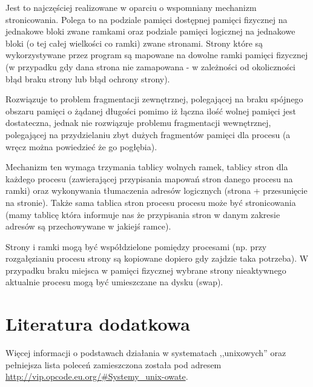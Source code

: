 \documentclass{pdfBooklets}
\begin{document}
Jest to najczęściej realizowane w oparciu o wspomniany mechanizm stronicowania. Polega to na podziale pamięci dostępnej pamięci fizycznej na jednakowe bloki zwane ramkami oraz podziale pamięci logicznej na jednakowe bloki (o tej całej wielkości co ramki) zwane stronami. Strony które są wykorzystywane przez program są mapowane na dowolne ramki pamięci fizycznej (w przypadku gdy dana strona nie zamapowana - w zależności od okoliczności błąd braku strony lub błąd ochrony strony).

Rozwiązuje to problem fragmentacji zewnętrznej, polegającej na braku spójnego obszaru pamięci o żądanej długości pomimo iż łączna ilość wolnej pamięci jest dostateczna, jednak nie rozwiązuje problemu fragmentacji wewnętrznej, polegającej na przydzielaniu zbyt dużych fragmentów pamięci dla procesu (a wręcz można powiedzieć że go pogłębia).

Mechanizm ten wymaga trzymania tablicy wolnych ramek, tablicy stron dla każdego procesu (zawierającej przypisania mapowań stron danego procesu na ramki) oraz wykonywania tłumaczenia adresów logicznych (strona + przesunięcie na stronie). Także sama tablica stron procesu procesu może być stronicowania (mamy tablicę która informuje nas że przypisania stron w danym zakresie adresów są przechowywane w jakiejś ramce).

Strony i ramki mogą być współdzielone pomiędzy procesami (np. przy rozgałęzianiu procesu strony są kopiowane dopiero gdy zajdzie taka potrzeba). W przypadku braku miejsca w pamięci fizycznej wybrane strony nieaktywnego aktualnie procesu mogą być umieszczane na dysku (swap).

\section{Literatura dodatkowa}
 Więcej informacji o podstawach działania w systematach ,,unixowych'' oraz pełniejsza lista poleceń zamieszczona została pod adresem \url{http://vip.opcode.eu.org/#Systemy_unix-owate}.

\rozwiazania

\end{document}

